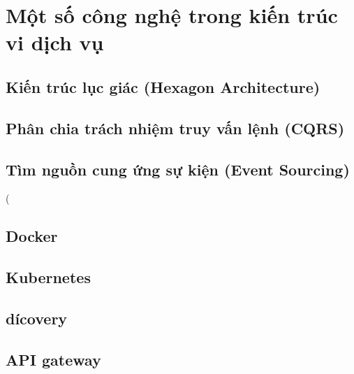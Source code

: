 \documentclass{report} %
\begin{document}
\chapter{Một số công nghệ trong kiến trúc vi dịch vụ}
\section{Kiến trúc lục giác (Hexagon Architecture)}




\section{Phân chia trách nhiệm truy vấn lệnh (CQRS)}


\section{Tìm nguồn cung ứng sự kiện (Event Sourcing)}
(





\section{Docker}

\section{Kubernetes}


\section{dícovery}


\section{API gateway}
\end{document}
